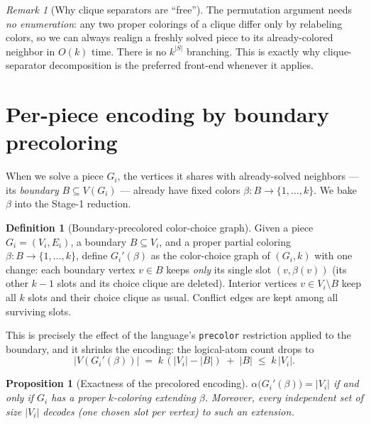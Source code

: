 \documentclass[11pt]{article}
\newtheorem{proposition}[theorem]{Proposition}
\theoremstyle{definition}
\newtheorem{definition}[theorem]{Definition}
\theoremstyle{remark}
\newtheorem{remark}[theorem]{Remark}
\newcommand{\indep}{\alpha}
\begin{document}
\begin{remark}[Why clique separators are ``free'']
The permutation argument needs \emph{no enumeration}: any two proper colorings of a
clique differ only by relabeling colors, so we can always realign a freshly solved
piece to its already-colored neighbor in $O(k)$ time. There is no $k^{|S|}$
branching. This is exactly why clique-separator decomposition is the preferred
front-end whenever it applies.
\end{remark}

\section{Per-piece encoding by boundary precoloring}
\label{sec:precolor}

When we solve a piece $G_i$, the vertices it shares with already-solved
neighbors --- its \emph{boundary} $B\subseteq V(G_i)$ --- already have fixed colors
$\beta:B\to\{1,\dots,k\}$. We bake $\beta$ into the Stage-1 reduction.

\begin{definition}[Boundary-precolored color-choice graph]
\label{def:precolorG}
Given a piece $G_i=(V_i,E_i)$, a boundary $B\subseteq V_i$, and a proper partial
coloring $\beta:B\to\{1,\dots,k\}$, define $G_i'(\beta)$ as the color-choice graph
of $(G_i,k)$ with one change: each boundary vertex $v\in B$ keeps \emph{only} its
single slot $(v,\beta(v))$ (its other $k-1$ slots and its choice clique are
deleted). Interior vertices $v\in V_i\setminus B$ keep all $k$ slots and their
choice clique as usual. Conflict edges are kept among all surviving slots.
\end{definition}

This is precisely the effect of the language's \texttt{precolor} restriction
applied to the boundary, and it shrinks the encoding: the logical-atom count drops
to
\[
   |V(G_i'(\beta))| \;=\; k\,(|V_i|-|B|) \;+\; |B| \;\le\; k\,|V_i|.
\]

\begin{proposition}[Exactness of the precolored encoding]
\label{prop:precolorexact}
$\indep\big(G_i'(\beta)\big) = |V_i|$ if and only if $G_i$ has a proper
$k$-coloring extending $\beta$. Moreover, every independent set of size $|V_i|$
decodes (one chosen slot per vertex) to such an extension.
\end{proposition}
\end{document}
